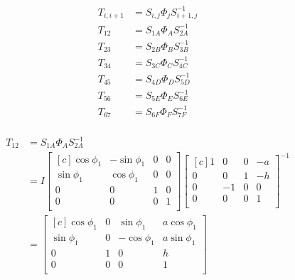 \documentclass[onecolumn,10pt]{jhwhw}
\begin{document}
\begin{align*}
T_{i,i+1} &= S_{i, j} \Phi_j S_{i+1,j}^{-1} \\
T_{12} &= S_{1A} \Phi_A S_{2A}^{-1} \\
T_{23} &= S_{2B} \Phi_B S_{3B}^{-1} \\
T_{34} &= S_{3C} \Phi_C S_{4C}^{-1} \\
T_{45} &= S_{4D} \Phi_D S_{5D}^{-1} \\
T_{56} &= S_{5E} \Phi_E S_{6E}^{-1} \\
T_{67} &= S_{6F} \Phi_F S_{7F}^{-1} \\
\end{align*}

\begin{align*}
T_{12} &= S_{1A} \Phi_A S_{2A}^{-1} \\
&= I 
\begin{bmatrix*}[c]
\cos \phi_1 & -\sin \phi_1 & 0 & 0 \\
\sin \phi_1 &  \cos \phi_1 & 0 & 0 \\
          0 &            0 & 1 & 0 \\
          0 &            0 & 0 & 1 \\
\end{bmatrix*}
\begin{bmatrix*}[c]
1 & 0 & 0 & -a \\
0 & 0 & 1 & -h \\
0 & -1 & 0 & 0 \\
0 & 0 & 0 & 1 \\
\end{bmatrix*}^{-1} \\
&= 
\begin{bmatrix*}[c]
\cos \phi_1 & 0 &  \sin \phi_1 & a \cos \phi_1 \\
\sin \phi_1 & 0 & -\cos \phi_1 & a \sin \phi_1 \\
       0 & 1 &         0 &          h \\
       0 & 0 &         0 &          1 \\
\end{bmatrix*}
\end{align*}
\end{document}
